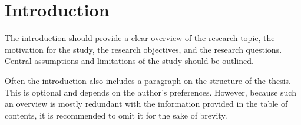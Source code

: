 \chapter{Introduction}
\label{cha:introduction}

The introduction should provide a clear overview of the research topic, the motivation for the study, the research objectives, and the research questions. Central assumptions and limitations of the study should be outlined.

Often the introduction also includes a paragraph on the structure of the thesis. This is optional and depends on the author's preferences. However, because such an overview is mostly redundant with the information provided in the table of contents, it is recommended to omit it for the sake of brevity.
